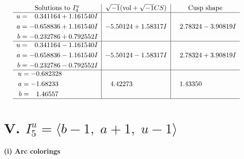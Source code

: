 \documentclass[1p]{elsarticle_modified}
\theoremstyle{definition}
\newcommand{\I}{\sqrt{-1}}
\begin{document}
$$\begin{array}{c|c|c}  
\text{Solutions to }I^u_{4}& \I (\text{vol} + \sqrt{-1}CS) & \text{Cusp shape}\\
 \hline 
\begin{aligned}
u &= \phantom{-}0.341164 + 1.161540 I \\
a &= -0.658836 + 1.161540 I \\
b &= -0.232786 + 0.792552 I\end{aligned}
 & -5.50124 + 1.58317 I & \phantom{-}2.78324 - 3.90819 I \\ \hline\begin{aligned}
u &= \phantom{-}0.341164 - 1.161540 I \\
a &= -0.658836 - 1.161540 I \\
b &= -0.232786 - 0.792552 I\end{aligned}
 & -5.50124 - 1.58317 I & \phantom{-}2.78324 + 3.90819 I \\ \hline\begin{aligned}
u &= -0.682328\phantom{ +0.000000I} \\
a &= -1.68233\phantom{ +0.000000I} \\
b &= \phantom{-}1.46557\phantom{ +0.000000I}\end{aligned}
 & \phantom{-}4.42273\phantom{ +0.000000I} & \phantom{-}1.43350\phantom{ +0.000000I}\\
 \hline 
 \end{array}$$\newpage\newpage\renewcommand{\arraystretch}{1}
\centering \section*{V. $I^u_{5}= \langle b-1,\;a+1,\;u-1 \rangle$}
\flushleft \textbf{(i) Arc colorings}\\
\end{document}
